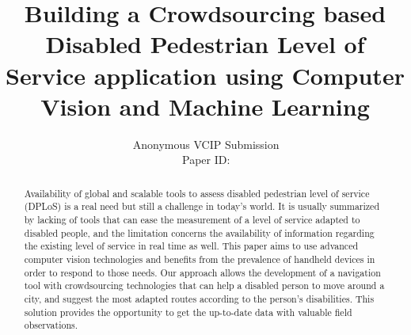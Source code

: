 \documentclass[10pt,conference,a4paper]{IEEEtran}
\title{Building a Crowdsourcing based Disabled Pedestrian Level of Service application using Computer Vision and Machine Learning}
\author{%
\,Anonymous VCIP Submission\\
\,Paper ID:

} %
\begin{document}
\maketitle

\begin{figure}[b]
\parbox{\hsize}{\em

}\end{figure}


\begin{abstract}
   Availability of global and scalable tools to assess disabled pedestrian level of service (DPLoS) is a real need but still a challenge in today’s world. It is usually summarized by lacking of tools that can ease the measurement of a level of service adapted to disabled people, and the limitation concerns the availability of information regarding the existing level of service in real time as well. This paper aims to use advanced computer vision technologies and benefits from the prevalence of handheld devices in order to respond to those needs. Our approach allows the development of a navigation tool with crowdsourcing technologies that can help a disabled person to move around a city, and suggest the most adapted routes according to the person’s disabilities. This solution provides the opportunity to get the up-to-date data with valuable field observations.
\\[1\baselineskip]
\end{abstract}

%

\end{document}
